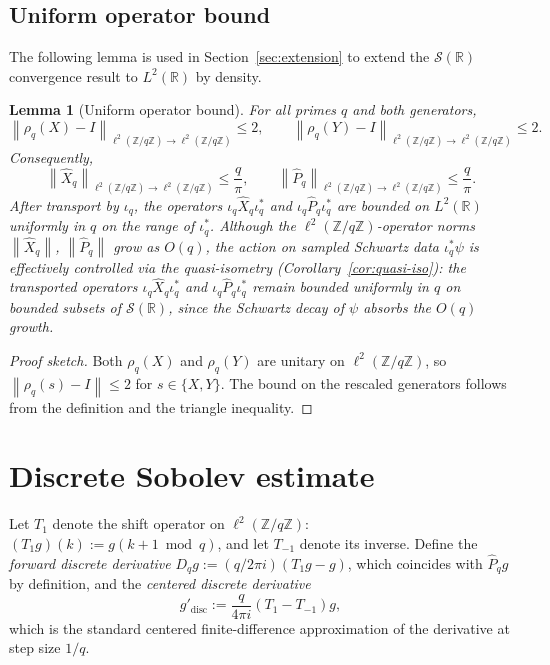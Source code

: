 \documentclass[12pt,a4paper]{article}
\newtheorem{lemma}[theorem]{Lemma}
\newcommand{\Zq}{\mathbb{Z}/q\mathbb{Z}}
\newcommand{\ltwo}{L^2(\mathbb{R})}
\newcommand{\ltwod}{\ell^2(\Zq)}
\newcommand{\Schwartz}{\mathcal{S}(\mathbb{R})}
\newcommand{\iotaq}{\iota_q}
\newcommand{\iotastar}{\iota_q^*}
\newcommand{\Xhat}{\hat{X}_q}
\newcommand{\Phat}{\hat{P}_q}
\newcommand{\norm}[1]{\left\|#1\right\|}
\begin{document}
    \subsection{Uniform operator bound}

      The following lemma is used in Section~\ref{sec:extension} to extend
      the $\Schwartz$ convergence result to $\ltwo$ by density.

      \begin{lemma}[Uniform operator bound]
        \label{lem:uniform-bound}
        For all primes $q$ and both generators,
        \[
          \norm{\rho_q(X) - I}_{\ltwod \to \ltwod} \leq 2, \qquad
          \norm{\rho_q(Y) - I}_{\ltwod \to \ltwod} \leq 2.
        \]
        Consequently,
        \[
          \norm{\Xhat}_{\ltwod \to \ltwod} \leq \frac{q}{\pi}, \qquad
          \norm{\Phat}_{\ltwod \to \ltwod} \leq \frac{q}{\pi}.
        \]
        After transport by $\iotaq$, the operators $\iotaq \Xhat \iotastar$ and
        $\iotaq \Phat \iotastar$ are bounded on $\ltwo$ uniformly in $q$ on the range of $\iotastar$.
        Although the $\ltwod$-operator norms $\norm{\Xhat}$, $\norm{\Phat}$ grow as $O(q)$,
        the action on sampled Schwartz data $\iotastar\psi$ is effectively controlled via the quasi-isometry
        (Corollary~\ref{cor:quasi-iso}): the transported operators $\iotaq\Xhat\iotastar$ and
        $\iotaq\Phat\iotastar$ remain bounded uniformly in $q$ on bounded subsets of $\Schwartz$,
        since the Schwartz decay of $\psi$ absorbs the $O(q)$ growth.
      \end{lemma}

      \begin{proof}
        [Proof sketch]
Both $\rho_q(X)$ and $\rho_q(Y)$ are unitary on $\ltwod$, so $\norm{\rho_q(s) - I} \leq 2$
for $s \in \{X, Y\}$.
The bound on the rescaled generators follows from the definition and the triangle inequality.
      \end{proof}

      \newpage
  \section{Discrete Sobolev estimate}
    \label{sec:sobolev}

    Let $T_1$ denote the shift operator on $\ltwod$: $(T_1 g)(k) := g(k+1 \bmod q)$,
    and let $T_{-1}$ denote its inverse.
    Define the \emph{forward discrete derivative} $D_q g := (q/2\pi i)(T_1 g - g)$,
    which coincides with $\Phat g$ by definition, and the \emph{centered discrete derivative}
    \[
      g'_{\mathrm{disc}} := \frac{q}{4\pi i}(T_1 - T_{-1})g,
    \]
    which is the standard centered finite-difference approximation of the derivative at step size $1/q$.
\end{document}
